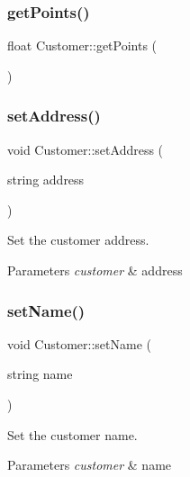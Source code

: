 \subsubsection{\texorpdfstring{get\+Points()}{getPoints()}}
{\footnotesize\ttfamily float Customer\+::get\+Points (\begin{DoxyParamCaption}{ }\end{DoxyParamCaption})}

\hypertarget{classCustomer_aa955fe10dc1855ca78353b1677f76639}{}\label{classCustomer_aa955fe10dc1855ca78353b1677f76639} 
\subsubsection{\texorpdfstring{set\+Address()}{setAddress()}}
{\footnotesize\ttfamily void Customer\+::set\+Address (\begin{DoxyParamCaption}\item[{string}]{address }\end{DoxyParamCaption})}

Set the customer address. 
\begin{DoxyParams}{Parameters}
{\em customer} & address \\
\hline
\end{DoxyParams}
\hypertarget{classCustomer_a7f9fdbe148a20c2ac310ea52f0a5311f}{}\label{classCustomer_a7f9fdbe148a20c2ac310ea52f0a5311f} 
\subsubsection{\texorpdfstring{set\+Name()}{setName()}}
{\footnotesize\ttfamily void Customer\+::set\+Name (\begin{DoxyParamCaption}\item[{string}]{name }\end{DoxyParamCaption})}

Set the customer name. 
\begin{DoxyParams}{Parameters}
{\em customer} & name \\
\hline
\end{DoxyParams}
\hypertarget{classCustomer_a9260f17157643a0f7e57e233f8441e9b}{}\label{classCustomer_a9260f17157643a0f7e57e233f8441e9b} 
